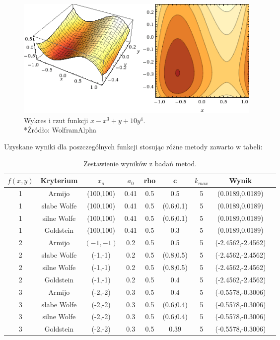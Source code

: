 \documentclass{classrep}
\begin{document}
\begin{figure}[H]
\centering
\includegraphics[width=12cm]{obrazy/funkcja_3} 
\caption{Wykres i rzut funkcji $x-x^3 +y+10y^4$.\\*{\footnotesize Źródło: WolframAlpha}}
\label{fig:funkcja_3}
\end{figure}

Uzyskane wyniki dla poszczególnych funkcji stosując różne metody zawarto w tabeli:

\begin{table}[H]
	\begin{center}
	\begin{tabular}{|c|c|c|c|c|c|c|c|c}
	\hline $f(x,y)$ & Kryterium & $x_o$ & $a_0$ & rho & c & $k_{max}$ & Wynik\\ 
	\hline 1 & Armijo & (100,100) & 0.41 & 0.5 & 0.5 & 5 &  (0.0189,0.0189) \\ 
	\hline 1 & słabe Wolfe & (100,100) & 0.41 & 0.5 & (0.6;0.1) & 5 & (0.0189,0.0189) \\
	\hline 1 & silne Wolfe & (100,100) & 0.41 & 0.5 & (0.6;0.1) & 5 & (0.0189,0.0189) \\
	\hline 1 & Goldstein & (100,100) & 0.41 & 0.5 & 0.3 & 5 & (0.0189,0.0189) \\
	\hline 2 & Armijo & $(-1,-1)$ & 0.2 & 0.5 & 0.5 & 5 &(-2.4562,-2.4562) \\ 
	\hline 2 & słabe Wolfe & (-1,-1) & 0.2 & 0.5 & (0.8;0.5) & 5 &(-2.4562,-2.4562) \\ 
	\hline 2 & silne Wolfe & (-1,-1) & 0.2 & 0.5 & (0.8;0.5) & 5 &(-2.4562,-2.4562) \\ 
	\hline 2 & Goldstein & (-1,-1) & 0.2 & 0.5 & 0.4 & 5 &(-2.4562,-2.4562) \\ 
	\hline 3 & Armijo & (-2,-2) & 0.3 & 0.5 & 0.4 & 5 & (-0.5578,-0.3006) \\ 
	\hline 3 & słabe Wolfe & (-2,-2) & 0.3 & 0.5 & (0.6;0.4) & 5 & (-0.5578,-0.3006) \\ 
	\hline 3 & silne Wolfe & (-2,-2) & 0.3 & 0.5 & (0.6;0.4) & 5 & (-0.5578,-0.3006) \\ 
	\hline 3 & Goldstein & (-2,-2) & 0.3 & 0.5 & 0.39 & 5 & (-0.5578,-0.3006) \\ 
	\hline 
	\end{tabular} 
	\caption{Zestawienie wyników z badań metod.}
	\end{center}
\end{table}
	
\end{document}
